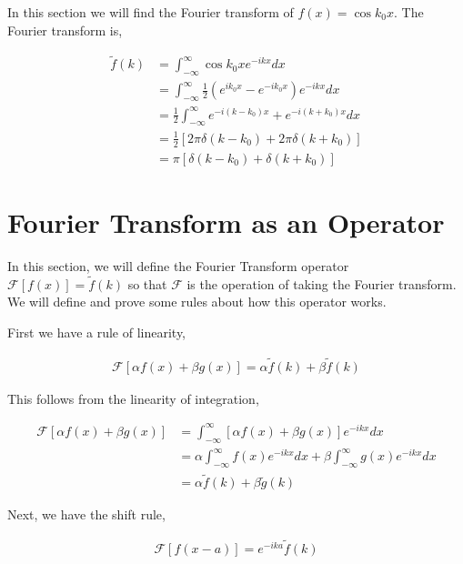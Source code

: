 \documentclass[11pt]{amsart}
\begin{document}
In this section we will find the Fourier transform of $f(x) = \cos{k_0 x}$. The Fourier transform is,

\begin{align*}
  \tilde{f}(k) &= \int_{-\infty}^{\infty} \cos{k_0 x} e^{-ikx} dx \\
               &= \int_{-\infty}^{\infty} \frac{1}{2}\left(e^{ik_0 x} - e^{-ik_0 x}\right) e^{-ikx} dx \\
               &= \frac{1}{2} \int_{-\infty}^{\infty} e^{-i(k-k_0)x} + e^{-i(k+k_0)x} dx \\
               &= \frac{1}{2} \left[2\pi\delta(k-k_0) + 2\pi \delta(k+k_0)\right] \\
               &= \pi \left[\delta(k-k_0) + \delta(k+k_0)\right]
\end{align*}

\section{Fourier Transform as an Operator}

In this section, we will define the Fourier Transform operator $\mathcal{F}\left[f(x)\right] = \tilde{f}(k)$ so that $\mathcal{F}$ is the operation of taking the Fourier transform. We will define and prove some rules about how this operator works.

First we have a rule of linearity,

\begin{align*}
  \mathcal{F}\left[\alpha f(x) + \beta g(x)\right] = \alpha\tilde{f}(k)+\beta\tilde{f}(k)
\end{align*}

This follows from the linearity of integration,

\begin{align*}
  \mathcal{F}\left[\alpha f(x) + \beta g(x)\right] &= \int_{-\infty}^{\infty} \left[\alpha f(x) + \beta g(x)\right] e^{-ikx} dx \\
                                                   &= \alpha\int_{-\infty}^{\infty}f(x)e^{-ikx}dx + \beta\int_{-\infty}^{\infty}g(x)e^{-ikx}dx \\
                                                   &= \alpha\tilde{f}(k) + \beta\tilde{g}(k)
\end{align*}

Next, we have the shift rule,

\begin{align*}
  \mathcal{F}\left[f(x-a)\right] = e^{-ika} \tilde{f}(k)
\end{align*}
\end{document}
